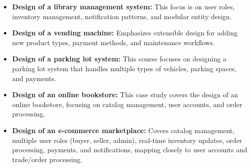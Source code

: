 \begin{itemize}
\item
\protect{}\label{A6-bj3IU6Erqg5zp2554J}
\textbf{Design of a library management system:} This focus is on user roles, inventory management, notification patterns, and modular entity design.
\item
\protect{}\label{yiShubi_NQbKy3EqeHTpZ}
\textbf{Design of a vending machine:} Emphasizes extensible design for adding new product types, payment methods, and maintenance workflows.
\item
\protect{}\label{1MXLIXl4YrO6lIPFrbW_3}
\textbf{Design of a parking lot system:} This course focuses on designing a parking lot system that handles multiple types of vehicles, parking spaces, and payments.
\item
\protect{}\label{_dcdG7JEG4-Oi3yEJSlOO}
\textbf{Design of an online bookstore:} This case study covers the design of an online bookstore, focusing on catalog management, user accounts, and order processing.
\item
\protect{}\label{yUCe1mOnfcwL1-6_FUdfV}
\textbf{Design of an e-commerce marketplace:} Covers catalog management, multiple user roles (buyer, seller, admin), real-time inventory updates, order processing, payments, and notifications, mapping closely to user accounts and trade/order processing.
\end{itemize}

